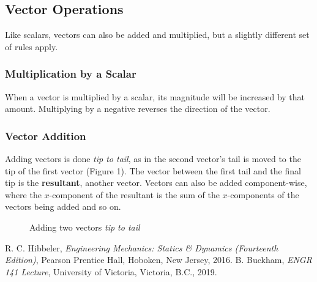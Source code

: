 \documentclass[12pt]{article}
\begin{document}
\subsection{Vector Operations}
Like scalars, vectors can also be added and multiplied, but a slightly different set of rules apply.

\subsubsection*{Multiplication by a Scalar}
When a vector is multiplied by a scalar, its magnitude will be increased by that amount. 
Multiplying by a negative reverses the direction of the vector.

\subsubsection*{Vector Addition}
Adding vectors is done \textit{tip to tail}, as in the second vector's tail is moved to the tip of the first vector (Figure 1).
The vector between the first tail and the final tip is the \textbf{resultant}, another vector.
Vectors can also be added component-wise, where the $x$-component of the resultant is the sum of the $x$-components of the vectors being added and so on.

\begin{figure}
\centering
{}
\caption{Adding two vectors \textit{tip to tail}}
\end{figure}


\pagebreak
{}
\begin{thebibliography}{2}
    R. C. Hibbeler, \textit{Engineering Mechanics: Statics \& Dynamics (Fourteenth Edition)}, Pearson Prentice Hall, Hoboken, New Jersey, 2016.
    B. Buckham, \textit{ENGR 141 Lecture}, University of Victoria, Victoria, B.C., 2019.
\end{thebibliography}
\end{document}
